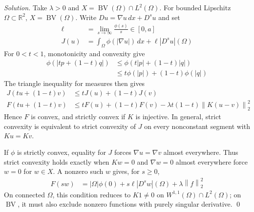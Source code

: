 \documentclass[12pt,letterpaper]{article}
\newcommand{\R}{\mathbb R}
\newcommand{\BV}{\operatorname{BV}}
\newcommand{\norm}[1]{\left\lVert #1\right\rVert}
\newcommand{\solution}{\par\medskip\noindent\textit{Solution.}\enspace}
\newcommand{\finish}{\qed\par}
\begin{document}
\solution
Take $\lambda>0$ and $X=\BV(\Omega)\cap L^2(\Omega)$.
For bounded Lipschitz $\Omega\subset\R^2$, $X=\BV(\Omega)$.
Write $Du=\nabla u\,dx+D^su$ and set
\begin{align*}
 \ell&=\lim_{s\to\infty}\frac{\phi(s)}s\in[0,a]\\
 J(u)&=\int_\Omega\phi(|\nabla u|)\,dx+\ell|D^su|(\Omega)
\end{align*}
For $0<t<1$, monotonicity and convexity give
\begin{align*}
 \phi(|tp+(1-t)q|)
 &\leq\phi(t|p|+(1-t)|q|)\\
 &\leq t\phi(|p|)+(1-t)\phi(|q|)
\end{align*}
The triangle inequality for measures then gives
\begin{align*}
 J(tu+(1-t)v)&\leq tJ(u)+(1-t)J(v)\\
 F(tu+(1-t)v)
 &\leq tF(u)+(1-t)F(v)
       -\lambda t(1-t)\norm{K(u-v)}_2^2
\end{align*}
Hence $F$ is convex, and strictly convex if $K$ is injective.
In general, strict convexity is equivalent to strict convexity of $J$
on every nonconstant segment with $Ku=Kv$.

If $\phi$ is strictly convex, equality for $J$ forces
$\nabla u=\nabla v$ almost everywhere. Thus strict convexity holds
exactly when $Kw=0$ and $\nabla w=0$ almost everywhere force $w=0$
for $w\in X$. A nonzero such $w$ gives, for $s\geq0$,
\begin{align*}
 F(sw)&=|\Omega|\phi(0)+s\ell|D^sw|(\Omega)+\lambda\norm f_2^2
\end{align*}
On connected $\Omega$, this condition reduces to $K1\ne0$ on
$W^{1,1}(\Omega)\cap L^2(\Omega)$; on $\BV$, it must also exclude
nonzero functions with purely singular derivative.
\finish
\end{document}
